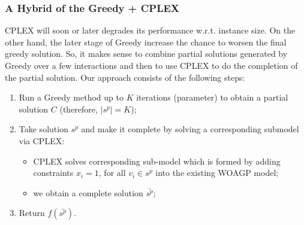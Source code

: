 \documentclass[runningheads,a4paper]{elsarticle}
\begin{document}
	
	
	
	\subsubsection{A Hybrid of the Greedy + CPLEX} 
	CPLEX will soon or later degrades its performance w.r.t. instance size. On the other hand, the later stage of Greedy increase the chance to worsen the final greedy solution.  So, it makes sense to combine  partial solutions generated by  Greedy over a few interactions  and then to use CPLEX to do the completion of the partial solution. Our approach consists of the following steps:
	\begin{enumerate}
		\item Run a Greedy method up to $K$ iterations (parameter) to obtain a partial solution $C$ (therefore, $|s^p| = K$);
		\item Take solution $s^p$ and make it complete by solving a corresponding submodel via CPLEX:
		\begin{itemize}
			\item CPLEX solves corresponding sub-model which is formed by adding constraints $x_{i} = 1$, for all $v_i \in s^p$ into the existing WOAGP model;
			\item we obtain a complete solution $\bar {s^p}$;
		\end{itemize}
		\item Return $f(\bar {s^p})$.
	\end{enumerate}
	
	\begin{comment}
	
	\noindent \textbf{Improvements of the above method.} The above method can serve as a basic iteration
	of a more advanced techniques like ILP-LNS or CMSA. In this case, methods for destructing the solutions
	has to be proposed.  Underlying idea could be:
	\begin{itemize}
	\item remove $N$ guards with the largest costs out of $C'$
	\item remove $N$ guards which have a higher amount of points from $D(P)$ covered by other guards, represented by the function
	\begin{align}
	ratio(i) = \frac{\sum_{v \in V\setminus{ \{i\}}, j \in V(i)} 1_{j \mbox{ is veasible from } v} }{|V(i)|}.
	\end{align}
	\end{itemize}
	\end{comment}
	
\end{document}
